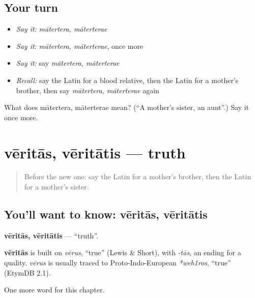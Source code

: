 \subsection*{Your turn}
\begin{itemize}
\raggedright
  \item \emph{Say it:} \emph{mātertera, māterterae}
  \item \emph{Say it:} \emph{mātertera, māterterae}, once more
  \item \emph{Say it:} say \emph{mātertera, māterterae}
  \item \emph{Recall:} say the Latin for a blood relative, then the Latin for a mother's brother, then say \emph{mātertera, māterterae} again
\end{itemize}

\begin{tcolorbox}[breakable,colback=teal!4,colframe=teal!35!black,title={Before you move on}]
What does mātertera, māterterae mean? (\textquotedblleft{}A mother's sister, an aunt\textquotedblright{}.) Say it once more.
\end{tcolorbox}
\section[vēritās, vēritātis]{vēritās, vēritātis — truth}

\label{lesson:LA-C189-veritas}



\begin{quote}
Before the new one: say the Latin for a mother's brother, then the Latin for a mother's sister.
\end{quote}

\subsection*{You'll want to know: vēritās, vēritātis}
\textbf{vēritās, vēritātis} — \textquotedblleft{}truth\textquotedblright{}.

\begin{cousinweb}
\textbf{vēritās} is built on \emph{vērus}, \textquotedblleft{}true\textquotedblright{} (Lewis \& Short), with \emph{-tās}, an ending for a quality. \emph{vērus} is usually traced to Proto-Indo-European \emph{*weh1ros}, \textquotedblleft{}true\textquotedblright{} (EtymDB 2.1).
\end{cousinweb}

\begin{grammarlens}[title={What you've built}]
One more word for this chapter.
\end{grammarlens}

